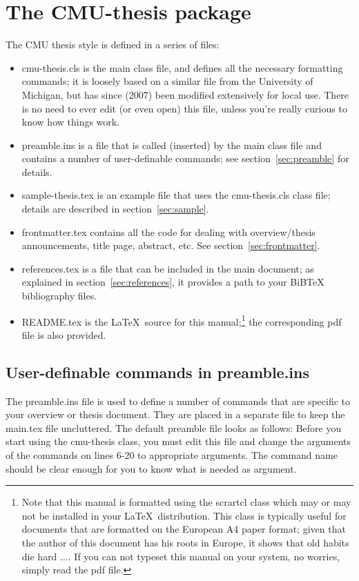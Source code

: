 \documentclass[DIV=calc, paper=letter, fontsize=11pt]{scrartcl}	 %
\begin{document}
\section{The CMU-thesis package}
The CMU thesis style is defined in a series of files:
\begin{itemize}
	\item \textsf{cmu-thesis.cls} is the main class file, and defines all the necessary formatting commands; it is loosely based 
	on a similar file from the University of Michigan, but has since (2007) been modified extensively for local use.  There is no need
	to ever edit (or even open) this file, unless you're really curious to know how things work.  
	\item \textsf{preamble.ins} is a file that is called (inserted) by the main class file and contains a number of user-definable commands; see
	section~\ref{sec:preamble} for details.
	\item \textsf{sample-thesis.tex} is an example file that uses the \textsf{cmu-thesis.cls} class file;  details are described in 
	section~\ref{sec:sample}.
	\item \textsf{frontmatter.tex} contains all the code for dealing with overview/thesis announcements, title page, abstract, etc.  See section~\ref{sec:frontmatter}.
	\item \textsf{references.tex} is a file that can be included in the main document; as explained in section~\ref{sec:references}, it provides
	a path to your BiBTeX bibliography files.
	\item \textsf{README.tex} is the \LaTeX\ source for this manual;\footnote{Note that this manual is formatted using
	the \textsf{scrartcl} class which may or may not be installed in your \LaTeX\ distribution.  This class is typically useful for 
	documents that are formatted on the European A4 paper format; given that the author of this document has his roots in
	Europe, it shows that old habits die hard $\ldots$.  If you can not typeset this manual on your system, no worries, simply
	read the pdf file.} the corresponding pdf file is also provided.
\end{itemize}


\subsection{User-definable commands in \textsf{preamble.ins}\label{sec:preamble}}
The \textsf{preamble.ins} file is used to define a number of commands that are specific
to your overview or thesis document. They are placed in a separate file to keep the 
\textsf{main.tex} file uncluttered.  The default preamble file looks as follows:
Before you start using the \textsf{cmu-thesis} class, you must edit this file and change the
arguments of the commands on lines 6-20 to appropriate arguments.  The command name 
should be clear enough for you to know what is needed as argument.
\end{document}
